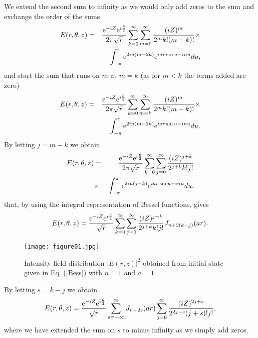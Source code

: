 \documentclass[aps,pra,reprint,superscriptaddress]{revtex4-2}
\begin{document}
%
%
We extend the second sum to infinity as we would only add zeros to the sum {\color{black} and} exchange the order of the sums
%
%
\begin{eqnarray}\nonumber
   E(r,\theta,z)&=&\frac{\hbox{e}^{{\color{black}-}iZ}\hbox{e}^{i\frac{\theta}{2}}}{2\pi\sqrt{r}}\sum_{k=0}^{\infty}\sum_{m=0}^{\infty}\frac{(iZ)^m}{2^mk!(m-k)!}
  \times\\ && \int_{-\pi}^{\pi}\hbox{e}^{2iu(m-2k)}\hbox{e}^{iar\sin u-inu}du,
\end{eqnarray}
%
%
and start the sum that runs on $m$ at $m=k$ (as for $m<k$ the terms added are zero)
%
%
\begin{eqnarray}\nonumber
   E(r,\theta,z)&=&\frac{\hbox{e}^{{\color{black}-}iZ}\hbox{e}^{i\frac{\theta}{2}}}{2\pi\sqrt{r}}\sum_{k=0}^{\infty}\sum_{m=k}^{\infty}\frac{(iZ)^m}{2^mk!(m-k)!}
    \times\\ && \int_{-\pi}^{\pi}\hbox{e}^{2iu(m-2k)}\hbox{e}^{iar\sin u-inu}du.
\end{eqnarray}
%
%
By letting $j=m-k$ we obtain
%
%
\begin{eqnarray}\nonumber
   E(r,\theta,z)&=&\frac{\hbox{e}^{{\color{black}-}iZ}\hbox{e}^{i\frac{\theta}{2}}}{2\pi\sqrt{r}}\sum_{k=0}^{\infty}\sum_{j=0}^{\infty}\frac{(iZ)^{j+k}}{2^{j+k}k!j!}\\
   &\times&\int_{-\pi}^{\pi}\hbox{e}^{2iu(j-k)}\hbox{e}^{iar\sin u-inu}du,
\end{eqnarray}
%
%
that, by using the integral representation of Bessel functions, gives
%
%
\begin{equation}
   E(r,\theta,z)=\frac{\hbox{e}^{{\color{black}-}iZ}\hbox{e}^{i\frac{\theta}{2}}}{\sqrt{r}}\sum_{k=0}^{\infty}\sum_{j=0}^{\infty}\frac{(iZ)^{j+k}}{2^{j+k}k!j!}
  J_{n+2(k-j)}(ar).
\end{equation}


\begin{figure}
	\begin{center}
		\texttt{[image: figure01.jpg]} 
		\caption{Intensity field distribution $\vert E(r,z)\vert^2$ obtained from initial state given in Eq. (\ref{Bess}) with $n=1$ and $a=1$.} 
		\label{fig_1}
	\end{center}
\end{figure}
%
By letting $s=k-j$ we obtain
%
%
\begin{equation}
   E(r,\theta,z)=\frac{\hbox{e}^{{\color{black}-}iZ}\hbox{e}^{i\frac{\theta}{2}}}{\sqrt{r}}\sum_{s=-\infty}^{\infty}J_{n+2s}(ar)\sum_{j=0}^{\infty}\frac{(iZ)^{2j+s}}{2^{2j+s}(j+s)!j!},
 \end{equation}
 where we have extended the sum on $s$ to minus infinity as we simply add zeros.
\end{document}
